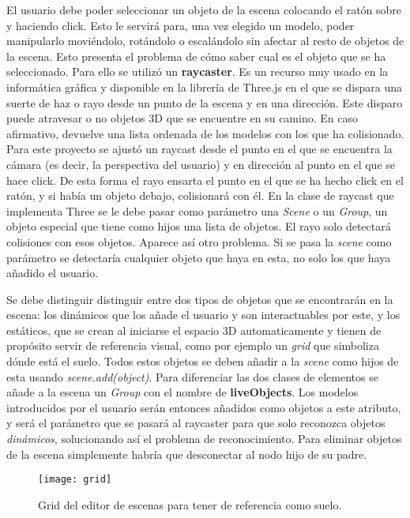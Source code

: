 El usuario debe poder seleccionar un objeto de la escena colocando el ratón sobre y haciendo click. Esto le servirá para, una vez elegido un modelo, poder manipularlo moviéndolo, rotándolo o escalándolo sin afectar al resto de objetos de la escena. Esto presenta el problema de cómo saber cual es el objeto que se ha seleccionado. Para ello se utilizó un \textbf{raycaster}. Es un recurso muy usado en la informática gráfica y disponible en la librería de Three.js en el que se dispara una suerte de haz o rayo desde un punto de la escena y en una dirección. Este disparo puede atravesar o no objetos 3D que se encuentre en su camino. En caso afirmativo, devuelve una lista ordenada de los modelos con los que ha colisionado. Para este proyecto se ajustó un raycast desde el punto en el que se encuentra la cámara (es decir, la perspectiva del usuario) y en dirección al punto en el que se hace click. De esta forma el rayo ensarta el punto en el que se ha hecho click en el ratón, y si había un objeto debajo, colisionará con él. En la clase de raycast que implementa Three se le debe pasar como parámetro una \textit{Scene} o un \textit{Group}, un objeto especial que tiene como hijos una lista de objetos. El rayo solo detectará colisiones con esos objetos. Aparece así otro problema. Si se pasa la \textit{scene} como parámetro se detectaría cualquier objeto que haya en esta, no solo los que haya añadido el usuario.

Se debe distinguir distinguir entre dos tipos de objetos que se encontrarán en la escena: los dinámicos que los añade el usuario y son interactuables por este, y los estáticos, que se crean al iniciarse el espacio 3D automaticamente y tienen de propósito servir de referencia visual, como por ejemplo un \textit{grid} que simboliza dónde está el suelo. Todos estos objetos se deben añadir a la \textit{scene} como hijos de esta usando \textit{scene.add(object)}. Para diferenciar las dos clases de elementos se añade a la escena un \textit{Group} con el nombre de \textbf{liveObjects}. Los modelos introducidos por el usuario serán entonces añadidos como objetos a este atributo, y será el parámetro que se pasará al raycaster para que solo reconozca objetos \textit{dinámicos}, solucionando así el problema de reconocimiento. Para eliminar objetos de la escena simplemente habría que desconectar al nodo hijo de su padre.

\begin{figure}[h]
    \centering
    \texttt{[image: grid]}
    \caption[Grid del editor de escenas]{Grid del editor de escenas para tener de referencia como suelo.}
\end{figure}

